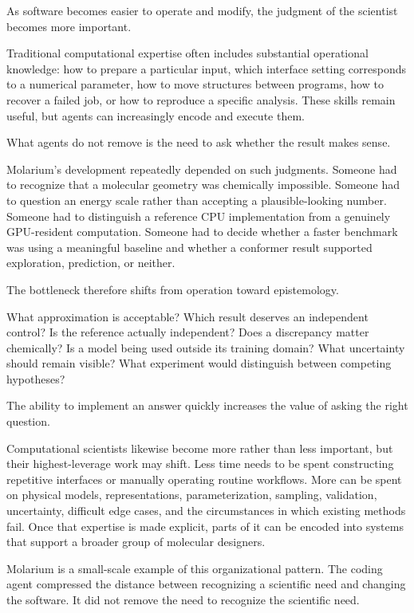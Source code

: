 \documentclass[11pt]{article}
\begin{document}
As software becomes easier to operate and modify, the judgment of the scientist becomes more important.

Traditional computational expertise often includes substantial operational knowledge: how to prepare a particular input, which interface setting corresponds to a numerical parameter, how to move structures between programs, how to recover a failed job, or how to reproduce a specific analysis. These skills remain useful, but agents can increasingly encode and execute them.

What agents do not remove is the need to ask whether the result makes sense.

Molarium's development repeatedly depended on such judgments. Someone had to recognize that a molecular geometry was chemically impossible. Someone had to question an energy scale rather than accepting a plausible-looking number. Someone had to distinguish a reference CPU implementation from a genuinely GPU-resident computation. Someone had to decide whether a faster benchmark was using a meaningful baseline and whether a conformer result supported exploration, prediction, or neither.

The bottleneck therefore shifts from operation toward epistemology.

What approximation is acceptable? Which result deserves an independent control? Is the reference actually independent? Does a discrepancy matter chemically? Is a model being used outside its training domain? What uncertainty should remain visible? What experiment would distinguish between competing hypotheses?

The ability to implement an answer quickly increases the value of asking the right question.

Computational scientists likewise become more rather than less important, but their highest-leverage work may shift. Less time needs to be spent constructing repetitive interfaces or manually operating routine workflows. More can be spent on physical models, representations, parameterization, sampling, validation, uncertainty, difficult edge cases, and the circumstances in which existing methods fail. Once that expertise is made explicit, parts of it can be encoded into systems that support a broader group of molecular designers.

Molarium is a small-scale example of this organizational pattern. The coding agent compressed the distance between recognizing a scientific need and changing the software. It did not remove the need to recognize the scientific need.
\end{document}
